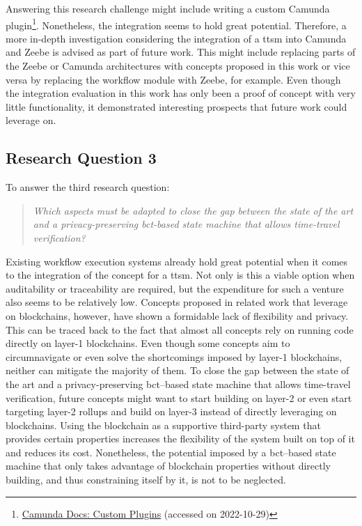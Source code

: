 Answering this research challenge might include writing a custom Camunda plugin\footnote{\href{https://docs.camunda.org/how-tos/cockpit/develop-a-plugin/}{Camunda Docs: Custom Plugins} (accessed on 2022-10-29)}. Nonetheless, the integration seems to hold great potential. Therefore, a more in-depth investigation considering the integration of a \gls{ttsm} into Camunda and Zeebe is advised as part of future work. This might include replacing parts of the Zeebe or Camunda architectures with concepts proposed in this work or vice versa by replacing the workflow module with Zeebe, for example. Even though the integration evaluation in this work has only been a proof of concept with very little functionality, it demonstrated interesting prospects that future work could leverage on.


\subsection{Research Question 3}
\label{sec:evaluation:integration:rq3}
To answer the third research question:

\begin{quote}
    \emph{Which aspects must be adapted to close the gap between the state of the art and a privacy-preserving \gls{bct}-based state machine that allows time-travel verification?}
\end{quote}

Existing workflow execution systems already hold great potential when it comes to the integration of the concept for a \gls{ttsm}. Not only is this a viable option when auditability or traceability are required, but the expenditure for such a venture also seems to be relatively low. Concepts proposed in related work that leverage on blockchains, however, have shown a formidable lack of flexibility and privacy. This can be traced back to the fact that almost all concepts rely on running code directly on layer-1 blockchains. Even though some concepts aim to circumnavigate or even solve the shortcomings imposed by layer-1 blockchains, neither can mitigate the majority of them. To close the gap between the state of the art and a privacy-preserving \gls{bct}–based state machine that allows time-travel verification, future concepts might want to start building on layer-2 or even start targeting layer-2 rollups and build on layer-3 instead of directly leveraging on blockchains. Using the blockchain as a supportive third-party system that provides certain properties increases the flexibility of the system built on top of it and reduces its cost. Nonetheless, the potential imposed by a \gls{bct}–based state machine that only takes advantage of blockchain properties without directly building, and thus constraining itself by it, is not to be neglected.

